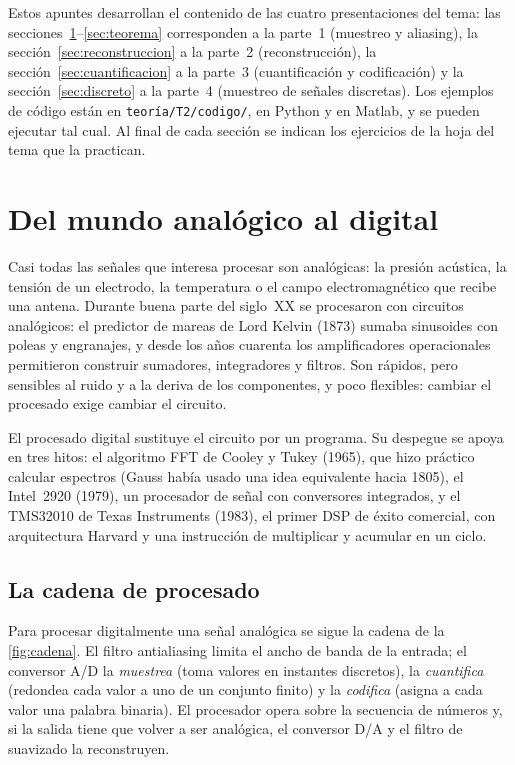 \documentclass[11pt,a4paper]{scrartcl}
\begin{document}

\begin{nota}
  Estos apuntes desarrollan el contenido de las cuatro presentaciones del tema: las secciones~\ref{sec:intro}–\ref{sec:teorema} corresponden a la parte~1 (muestreo y aliasing), la sección~\ref{sec:reconstruccion} a la parte~2 (reconstrucción), la sección~\ref{sec:cuantificacion} a la parte~3 (cuantificación y codificación) y la sección~\ref{sec:discreto} a la parte~4 (muestreo de señales discretas). Los ejemplos de código están en \texttt{teoría/T2/codigo/}, en Python y en Matlab, y se pueden ejecutar tal cual. Al final de cada sección se indican los ejercicios de la hoja del tema que la practican.
\end{nota}

\tableofcontents

\section{Del mundo analógico al digital}\label{sec:intro}

Casi todas las señales que interesa procesar son analógicas: la presión acústica, la tensión de un electrodo, la temperatura o el campo electromagnético que recibe una antena. Durante buena parte del siglo~XX se procesaron con circuitos analógicos: el predictor de mareas de Lord Kelvin (1873) sumaba sinusoides con poleas y engranajes, y desde los años cuarenta los amplificadores operacionales permitieron construir sumadores, integradores y filtros. Son rápidos, pero sensibles al ruido y a la deriva de los componentes, y poco flexibles: cambiar el procesado exige cambiar el circuito.

El procesado digital sustituye el circuito por un programa. Su despegue se apoya en tres hitos: el algoritmo FFT de Cooley y Tukey (1965), que hizo práctico calcular espectros (Gauss había usado una idea equivalente hacia 1805), el Intel~2920 (1979), un procesador de señal con conversores integrados, y el TMS32010 de Texas Instruments (1983), el primer DSP de éxito comercial, con arquitectura Harvard y una instrucción de multiplicar y acumular en un ciclo.

\subsection{La cadena de procesado}

Para procesar digitalmente una señal analógica se sigue la cadena de la \cref{fig:cadena}. El filtro antialiasing limita el ancho de banda de la entrada; el conversor A/D la \emph{muestrea} (toma valores en instantes discretos), la \emph{cuantifica} (redondea cada valor a uno de un conjunto finito) y la \emph{codifica} (asigna a cada valor una palabra binaria). El procesador opera sobre la secuencia de números y, si la salida tiene que volver a ser analógica, el conversor D/A y el filtro de suavizado la reconstruyen.
\end{document}
